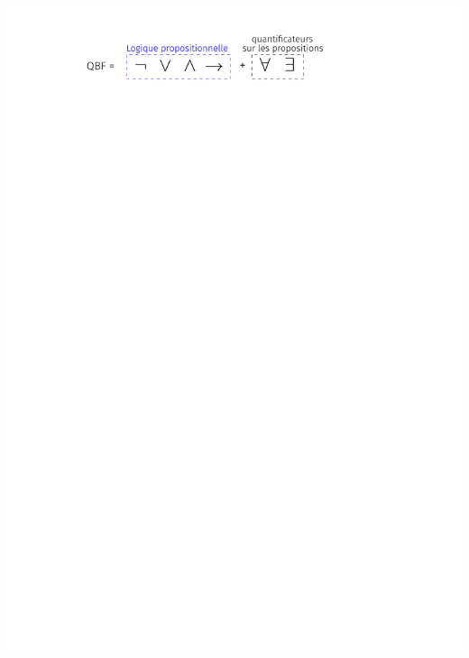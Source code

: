 \documentclass[english,french,usenames,dvipsnames]{beamer}
\begin{document}
\begin{frame}{\subsecname}
\includegraphics[width=1\textwidth]{figures/nim-arbre-0.pdf} \\ \vspace{0cm}
\end{frame}
\end{document}
